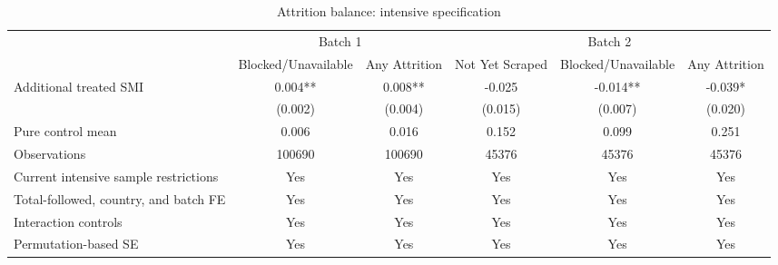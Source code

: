\begin{table}[!htbp]
    \centering
    \caption{Attrition balance: intensive specification}
    \label{tab:attrition_intensive}
    \scriptsize
    \begin{adjustbox}{width=\textwidth}
    \begin{tabular}{lccccc}
    \toprule
     & \multicolumn{2}{c}{Batch 1} & \multicolumn{3}{c}{Batch 2} \\
    \cmidrule(lr){2-3} \cmidrule(lr){4-6}
     & Blocked/Unavailable & Any Attrition & Not Yet Scraped & Blocked/Unavailable & Any Attrition \\
    \midrule
    Additional treated SMI & 0.004** & 0.008** & -0.025 & -0.014** & -0.039* \\
     & (0.002) & (0.004) & (0.015) & (0.007) & (0.020) \\
    Pure control mean & 0.006 & 0.016 & 0.152 & 0.099 & 0.251 \\
    Observations & 100690 & 100690 & 45376 & 45376 & 45376 \\
    Current intensive sample restrictions & Yes & Yes & Yes & Yes & Yes \\
    Total-followed, country, and batch FE & Yes & Yes & Yes & Yes & Yes \\
    Interaction controls & Yes & Yes & Yes & Yes & Yes \\
    Permutation-based SE & Yes & Yes & Yes & Yes & Yes \\
    \bottomrule
    \end{tabular}
    \end{adjustbox}
\end{table}
